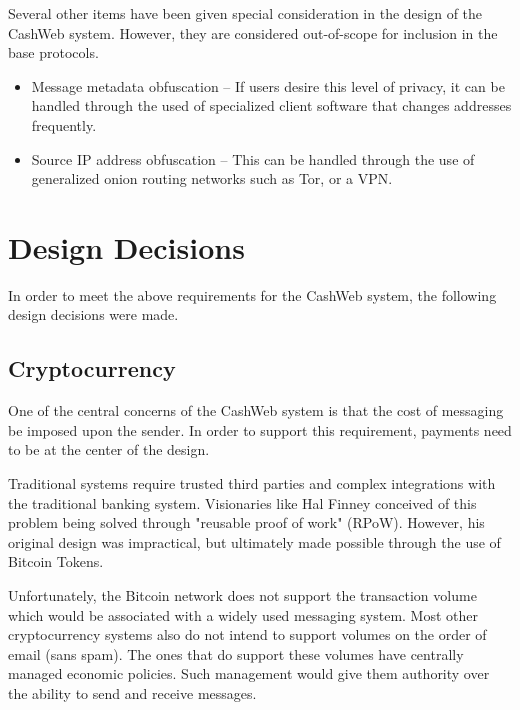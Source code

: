 \documentclass{article}
\theoremstyle{definition}
\begin{document}
Several other items have been given special consideration in the design of the CashWeb system. However, they are considered out-of-scope for inclusion in the base protocols.

\begin{itemize}
\item Message metadata obfuscation -- If users desire this level of privacy, it can be handled through the used of specialized client software that changes addresses frequently.
\item Source IP address obfuscation -- This can be handled through the use of generalized onion routing networks such as Tor, or a VPN.
\end{itemize}

\section{Design Decisions}


In order to meet the above requirements for the CashWeb system, the following design decisions were made.

\subsection{Cryptocurrency}

One of the central concerns of the CashWeb system is that the cost of messaging be imposed upon the sender. In order to support this requirement, payments need to be at the center of the design.

Traditional systems require trusted third parties and complex integrations with the traditional banking system. Visionaries like Hal Finney conceived of this problem being solved through "reusable proof of work" (RPoW). However, his original design was impractical, but ultimately made possible through the use of Bitcoin Tokens.

Unfortunately, the Bitcoin network does not support the transaction volume which would be associated with a widely used messaging system.  Most other cryptocurrency systems also do not intend to support volumes on the order of email (sans spam). The ones that do support these volumes have centrally managed economic policies. Such management would give them authority over the ability to send and receive messages.
\end{document}
